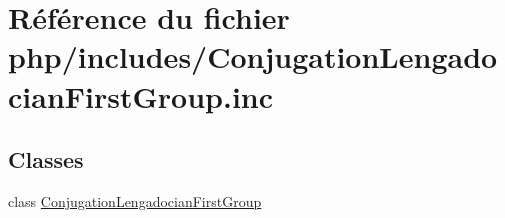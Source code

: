 \hypertarget{_conjugation_lengadocian_first_group_8inc}{}\section{Référence du fichier php/includes/\+Conjugation\+Lengadocian\+First\+Group.inc}
\label{_conjugation_lengadocian_first_group_8inc}
\subsection*{Classes}
\begin{DoxyCompactItemize}
\item 
class \hyperlink{class_conjugation_lengadocian_first_group}{Conjugation\+Lengadocian\+First\+Group}
\end{DoxyCompactItemize}
